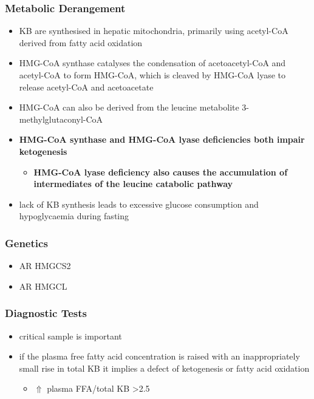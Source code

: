 \documentclass[12pt]{scrartcl}
\begin{document}
\subsubsection{Metabolic Derangement}
\label{sec:org288228a}
\begin{itemize}
\item KB are synthesised in hepatic mitochondria, primarily using
acetyl-CoA derived from fatty acid oxidation
\item HMG-CoA synthase catalyses the condensation of acetoacetyl-CoA and
acetyl-CoA to form HMG-CoA, which is cleaved by HMG-CoA lyase to
release acetyl-CoA and acetoacetate



\item HMG-CoA can also be derived from the leucine metabolite
3-methylglutaconyl-CoA
\item \textbf{HMG-CoA synthase and HMG-CoA lyase deficiencies both impair
ketogenesis}
\begin{itemize}
\item \textbf{HMG-CoA lyase deficiency also causes the accumulation of
intermediates of the leucine catabolic pathway}
\end{itemize}
\item lack of KB synthesis leads to excessive glucose consumption and
hypoglycaemia during fasting
\end{itemize}

\subsubsection{Genetics}
\label{sec:org13dcfc5}
\begin{itemize}
\item AR HMGCS2
\item AR HMGCL
\end{itemize}

\subsubsection{Diagnostic Tests}
\label{sec:orgf2068d2}
\begin{itemize}
\item critical sample is important
\item if the plasma free fatty acid concentration is raised with an
inappropriately small rise in total KB it implies a defect of
ketogenesis or fatty acid oxidation 
\begin{itemize}
\item \(\Uparrow\) plasma FFA/total KB >2.5
\end{itemize}
\end{itemize}
\end{document}
